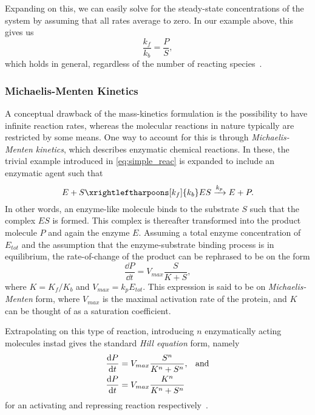 Expanding on this, we can easily solve for the steady-state concentrations of
the system by assuming that all rates average to zero. In our example above, this
gives us 
\begin{equation}
  \frac{k_f}{k_b} = \frac{P}{S},
  \label{eq:mass_action_ss}
\end{equation}
which holds in general, regardless of the number of reacting
species~\cite{horn1972general}.

\subsubsection[Michaelis-Menten Kinetics]{Michaelis-Menten Kinetics}
\label{sec:mm}
A conceptual drawback of the mass-kinetics formulation is the possibility to
have infinite reaction rates, whereas the molecular reactions in nature typically
are restricted by some means. One way to account for this is through
\textit{Michaelis-Menten kinetics}, which describes enzymatic chemical
reactions. In these, the trivial example introduced in \cref{eq:simple_reac} is
expanded to include an enzymatic agent such that
\begin{equation}
  E + S \xrightleftharpoons[k_f]{k_b} ES \xrightarrow{k_p} E + P.
  \label{eq:enzymatic_react}
\end{equation}
In other words, an enzyme-like molecule binds to the substrate $S$ such that the
complex $ES$ is formed. This complex is thereafter transformed into the product
molecule $P$ and again the enzyme $E$. Assuming a total enzyme concentration of
$E_{tot}$ and the assumption that the enzyme-substrate binding process is in
equilibrium, the rate-of-change of the product can be rephrased to be on the
form 
\begin{equation}
  \frac{\dd P}{\dd t} = V_{max} \frac{S}{K + S},
  \label{eq:michaelis-menten}
\end{equation}
where $K = K_f / K_b$ and $V_{max} = k_pE_{tot}$. This expression is said to be
on \textit{Michaelis-Menten} form, where $V_{max}$ is the maximal
activation rate of the protein, and $K$ can be thought of as a saturation
coefficient.

Extrapolating on this type of reaction, introducing $n$ enzymatically acting
molecules instad gives the standard \textit{Hill equation} form, namely
\begin{align}
  \frac{\dd P}{\dd t} &= V_{max} \frac{S^n}{K^n + S^n},\hspace{.8em} \text{and} \\
  \frac{\dd P}{\dd t} &= V_{max} \frac{K^n}{K^n + S^n}
  \label{eq:hill}
\end{align}
for an activating and repressing reaction respectively~\cite{chou1977simple}.

